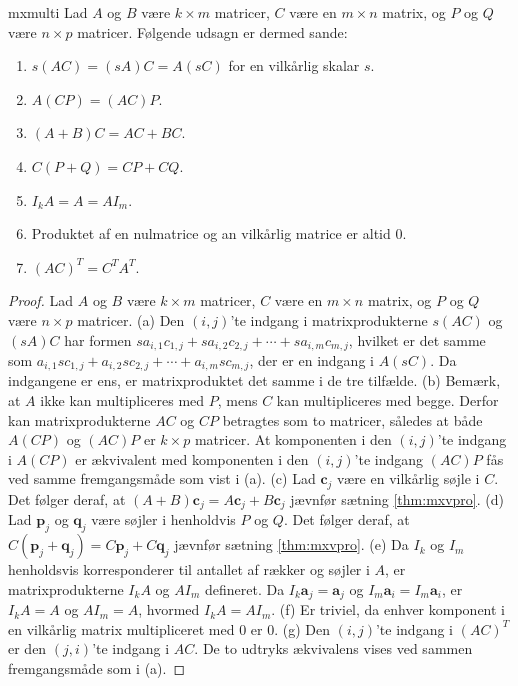 \begin{thm}{}{mxmulti}
Lad $A$ og $B$ være $k \times m$ matricer, $C$ være en $m \times n$ matrix, og $P$ og $Q$ være $n \times p$ matricer. Følgende udsagn er dermed sande:
\begin{enumerate}[label=(\alph*)]
\item $s(AC)=(sA)C=A(sC)$ for en vilkårlig skalar $s$.
\item $A(CP)=(AC)P$.
\item $(A+B)C=AC+BC$.
\item $C(P+Q)=CP+CQ$.
\item $I_kA=A=AI_m$.
\item Produktet af en nulmatrice og an vilkårlig matrice er altid $0$.
\item $(AC)^T=C^TA^T$.
\end{enumerate}
\end{thm}
\begin{proof}
Lad $A$ og $B$ være $k \times m$ matricer, $C$ være en $m \times n$ matrix, og $P$ og $Q$ være $n \times p$ matricer. 
(a) Den $(i,j)$'te indgang i matrixprodukterne $s(AC)$ og $(sA)C$ har formen $sa_{i,1}c_{1,j} + sa_{i,2}c_{2,j} + \cdots + sa_{i,m}c_{m,j}$, hvilket er det samme som $a_{i,1}sc_{1,j} + a_{i,2}sc_{2,j} + \cdots + a_{i,m}sc_{m,j}$, der er en indgang i $A(sC)$. 
Da indgangene er ens, er matrixproduktet det samme i de tre tilfælde.
(b) Bemærk, at $A$ ikke kan multipliceres med $P$, mens $C$ kan multipliceres med begge. 
Derfor kan matrixprodukterne $AC$ og $CP$ betragtes som to matricer, således at både $A(CP)$ og $(AC)P$ er $k \times p$ matricer. 
At komponenten i den $(i,j)$'te indgang i $A(CP)$ er ækvivalent med komponenten i den $(i,j)$'te indgang $(AC)P$ fås ved samme fremgangsmåde som vist i (a). 
(c) Lad $\textbf{c}_j$ være en vilkårlig søjle i $C$. 
Det følger deraf, at $(A+B)\textbf{c}_j=A\textbf{c}_j+B\textbf{c}_j$ jævnfør sætning \ref{thm:mxvpro}. 
(d) Lad $\textbf{p}_j$ og $\textbf{q}_j$ være søjler i henholdvis $P$ og $Q$. Det følger deraf, at $C(\textbf{p}_j+\textbf{q}_j)=C\textbf{p}_j+C\textbf{q}_j$ jævnfør sætning \ref{thm:mxvpro}. 
(e) Da $I_k$ og $I_m$ henholdsvis korresponderer til antallet af rækker og søjler i $A$, er matrixprodukterne $I_kA$ og $AI_m$ defineret. 
Da $I_k\textbf{a}_j=\textbf{a}_j$ og $I_m\textbf{a}_i=I_m\textbf{a}_i$, er $I_kA=A$ og $AI_m=A$, hvormed $I_kA=AI_m$.
(f) Er triviel, da enhver komponent i en vilkårlig matrix multipliceret med $0$ er $0$. 
(g) Den $(i,j)$'te indgang i $(AC)^T$ er den $(j,i)$'te indgang i $AC$. De to udtryks ækvivalens vises ved sammen fremgangsmåde som i (a).
\end{proof}